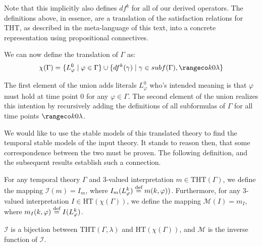 Note that this implicitly also defines $df^k$ for all of our derived
operators. The definitions above, in essence, are a translation of the
satisfaction relations for THT, as described in the meta-language of
this text, into a concrete representation using propositional
connectives.

We can now define the translation
of $\Gamma$ as:
$$
\chi(\Gamma) = \{ L_\varphi^0 \mid \varphi \in \Gamma \} 
\cup \{ df^k(\gamma) \mid \gamma \in subf(\Gamma), \kinlambda \}
$$

The first element of the union adds literals $L_\varphi^0$ who's
intended meaning is that $\varphi$ must hold at time point $0$ for any
$\varphi \in \Gamma$. The second element of the union realizes this
intention by recursively adding the definitions of all subformulas of
$\Gamma$ for all time points $\kinlambda$.

We would like to use the stable models of this translated theory to
find the temporal stable models of the input theory. It stands to
reason then, that some correspondence between the two must be
proven. The following definition, and the subsequent results establish
such a connection.
\begin{definition}
For any temporal theory $\Gamma$ and 3-valued interpretation
$m \in \text{THT}(\Gamma)$, we define the mapping
$\mathcal{I}(m) = I_m$, where $I_m(L^k_\varphi) \stackrel{\text{def}}{=}
m(k,\varphi))$. Furthermore, for any 3-valued interpretation
$I \in \text{HT}(\chi(\Gamma))$, we define the mapping
$\mathcal{M}(I) = m_I$, where
$m_I(k,\varphi) \stackrel{\text{def}}{=} I(L_{\varphi}^k)$.
\end{definition}

\begin{theorem}\label{theorem:translation}


  $\mathcal{I}$ is a bijection between
  $\text{THT}(\Gamma,\lambda)$ and $\text{HT}(\chi(\Gamma))$, and
  $\mathcal{M}$ is the inverse function of $\mathcal{I}$.
\end{theorem}

